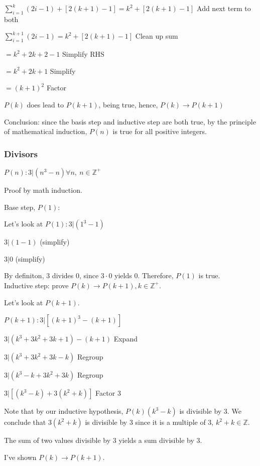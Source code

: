 \documentclass[english,openany]{book}
\begin{document}
    $\sum_{i=1}^{k} (2i-1) + [2(k+1)-1] = k^2 + [2(k+1)-1]$ Add next term to both

    $\sum_{i=1}^{k+1} (2i-1) = k^2 + [2(k+1)-1]$ Clean up sum

    \qquad \qquad $= k^2 + 2k + 2 - 1$ Simplify RHS

    \qquad \qquad $= k^2 + 2k + 1$ Simplify

    \qquad \qquad $= (k+1)^2$ Factor

    $P(k)$ does lead to $P(k+1)$, being true, hence, $P(k) \rightarrow P(k+1)$

    Conclusion: since the basis step and inductive step are both true, by the principle of mathematical induction, $P(n)$ is true for all positive integers.\\

    \subsubsection{Divisors}

    $P(n): 3|(n^3 - n) \forall n,\ n \in \mathbb Z^+$

    Proof by math induction.

    Base step, $P(1)$:

    Let's look at $P(1): 3|(1^3 - 1)$

    $3|(1-1)$ (simplify)

    $3|0$ (simplify)

    By definiton, 3 divides 0, since $3 \cdot 0$ yields 0. Therefore, $P(1)$ is true.\\

    Inductive step: prove $P(k) \rightarrow P(k+1), k \in \mathbb Z^+$.

    Let's look at $P(k+1)$.

    $P(k+1) : 3|[(k+1)^3 - (k+1)]$

    $3|(k^3+3k^2+3k+1)-(k+1)$ Expand

    $3|(k^3 + 3k^2 + 3k - k)$ Regroup

    $3|(k^3 - k + 3k^2 + 3k)$ Regroup

    $3|[(k^3-k)+3(k^2+k)]$ Factor 3

    Note that by our inductive hypothesis, $P(k) (k^3-k)$ is divisible by 3. We conclude that $3(k^2+k)$ is divisible by 3 since it is a multiple of 3, $k^2 + k \in \mathbb Z$.

    The sum of two values divisible by 3 yields a sum divisible by 3.

    I've shown $P(k) \rightarrow P(k+1)$.
\end{document}
